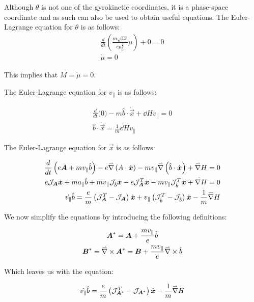 Although $\theta$ is not one of the gyrokinetic coordinates, it is a phase-space coordinate and as such can also be used to obtain useful equations. The Euler-Lagrange equation for $\theta$ is as follows:
\begin{align}
 \frac{d}{dt}\left(\frac{m\sqrt{4\pi}}{e\mu_0^{\frac{3}{2}}} \mu\right) + 0 = 0\\
 \dot{\mu} = 0\label{eq::mu dot def}
\end{align}

This implies that $M=\dot{\mu}=0$.

The Euler-Lagrange equation for $v_\parallel$ is as follows:

\begin{align}
 \frac{d}{dt}\Big(0\Big) - m \hat{b}\cdot\dot{\vec{x}}+\dd{H}{v_\parallel}=0\\
 \hat{b}\cdot\dot{\vec{x}}=\frac{1}{m}\dd{H}{v_\parallel}\label{eq::bxdotDefinition}
\end{align}

The Euler-Lagrange equation for $\vec{x}$ is as follows:

\begin{align}
 \frac{d}{dt}\left(e\boldsymbol{A}+mv_\parallel\hat{b}\right) - e\accentset{\rightharpoonup}{\nabla}\left(A\cdot\dot{\boldsymbol{x}}\right)-mv_\parallel\accentset{\rightharpoonup}{\nabla}\left(\hat{b}\cdot\dot{\boldsymbol{x}}\right) + \accentset{\rightharpoonup}{\nabla} H = 0\\
 e\mathcal{J}_{\boldsymbol{A}}\dot{\boldsymbol{x}} + ma_\parallel\hat{b} + mv_\parallel\mathcal{J}_{\hat{b}}\dot{\boldsymbol{x}} - e\mathcal{J}_{\boldsymbol{A}}^T\dot{\boldsymbol{x}} - mv_\parallel\mathcal{J}_{\hat{b}}^T\dot{\boldsymbol{x}} + \accentset{\rightharpoonup}{\nabla} H = 0\\
 \dot{v_\parallel}\hat{b} = \frac{e}{m}\left(\mathcal{J}_{\boldsymbol{A}}^T-\mathcal{J}_{\boldsymbol{A}}\right)\dot{\boldsymbol{x}} + v_\parallel \left(\mathcal{J}_{\hat{b}}^T-\mathcal{J}_{\hat{b}}\right)\dot{\boldsymbol{x}} - \frac{1}{m}\accentset{\rightharpoonup}{\nabla} H
\end{align}

We now simplify the equations by introducing the following definitions:

\begin{gather}
 \boldsymbol{A}^*=\boldsymbol{A}+\frac{mv_\parallel}{e}\hat{b}\\
 \boldsymbol{B}^*=\accentset{\rightharpoonup}{\nabla}\times\boldsymbol{A}^* = \boldsymbol{B}+\frac{mv_\parallel}{e}\accentset{\rightharpoonup}{\nabla}\times\hat{b}
\end{gather}

Which leaves us with the equation:

\begin{align}\label{eq::EulerLagX}
 \dot{v_\parallel}\hat{b} = \frac{e}{m}\left(\mathcal{J}_{\boldsymbol{A}^*}^T-\mathcal{J}_{\boldsymbol{A}^*}\right)\dot{\boldsymbol{x}} - \frac{1}{m}\accentset{\rightharpoonup}{\nabla} H
\end{align}

